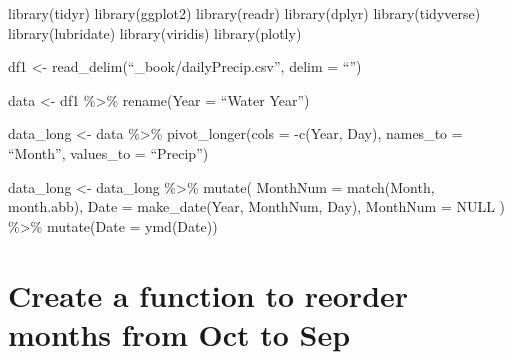 \documentclass[
]{book}
\newenvironment{Shaded}{\begin{snugshade}}{\end{snugshade}}
\newcommand{\AttributeTok}[1]{\textcolor[rgb]{0.77,0.63,0.00}{#1}}
\newcommand{\CommentTok}[1]{\textcolor[rgb]{0.56,0.35,0.01}{\textit{#1}}}
\newcommand{\ControlFlowTok}[1]{\textcolor[rgb]{0.13,0.29,0.53}{\textbf{#1}}}
\newcommand{\DecValTok}[1]{\textcolor[rgb]{0.00,0.00,0.81}{#1}}
\newcommand{\FunctionTok}[1]{\textcolor[rgb]{0.00,0.00,0.00}{#1}}
\newcommand{\NormalTok}[1]{#1}
\newcommand{\OtherTok}[1]{\textcolor[rgb]{0.56,0.35,0.01}{#1}}
\newcommand{\SpecialCharTok}[1]{\textcolor[rgb]{0.00,0.00,0.00}{#1}}
\newcommand{\StringTok}[1]{\textcolor[rgb]{0.31,0.60,0.02}{#1}}
\theoremstyle{definition}
\theoremstyle{definition}
\theoremstyle{definition}
\theoremstyle{definition}
\theoremstyle{remark}
\begin{document}
\begin{Shaded}
\end{Shaded}

library(tidyr)
library(ggplot2)
library(readr)
library(dplyr)
library(tidyverse)
library(lubridate)
library(viridis)
library(plotly)

df1 \textless- read\_delim(``\_book/dailyPrecip.csv'', delim = ``\textbar{}'')

data \textless- df1 \%\textgreater\%
rename(Year = ``Water Year'')

data\_long \textless- data \%\textgreater\%
pivot\_longer(cols = -c(Year, Day),
names\_to = ``Month'',
values\_to = ``Precip'')

data\_long \textless- data\_long \%\textgreater\%
mutate(
MonthNum = match(Month, month.abb),
Date = make\_date(Year, MonthNum, Day),
MonthNum = NULL
) \%\textgreater\%
mutate(Date = ymd(Date))

\hypertarget{create-a-function-to-reorder-months-from-oct-to-sep}{%
\chapter{Create a function to reorder months from Oct to Sep}\label{create-a-function-to-reorder-months-from-oct-to-sep}}
\end{document}
